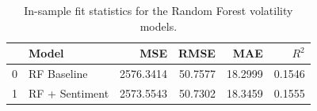 \begin{table}
\caption{In-sample fit statistics for the Random Forest volatility models.}
\label{tab:rf_in_sample_fit}
\begin{tabular}{llrrrr}
\toprule
 & Model & MSE & RMSE & MAE & $R^2$ \\
\midrule
0 & RF Baseline & 2576.3414 & 50.7577 & 18.2999 & 0.1546 \\
1 & RF + Sentiment & 2573.5543 & 50.7302 & 18.3459 & 0.1555 \\
\bottomrule
\end{tabular}
\end{table}
